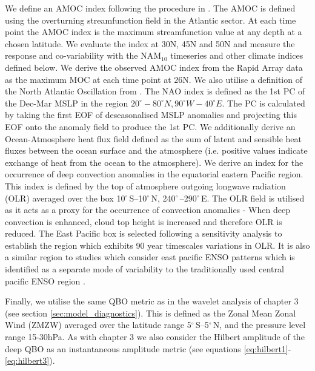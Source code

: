 We define an AMOC index following the procedure in \cite{reichlerStratospheric2012b}. The AMOC is defined using the overturning streamfunction field in the Atlantic sector. At each time point the AMOC index is the maximum streamfunction value at any depth at a chosen latitude. We evaluate the index at 30N, 45N and 50N and measure the response and co-variability with the NAM$_{10}$ timeseries and other climate indices defined below. We derive the observed AMOC index from the Rapid Array data as the maximum MOC at each time point at 26N. We also utilise a definition of the North Atlantic Oscillation from \cite{hurrellNorth2003c}. The NAO index is defined as the 1st PC of the Dec-Mar MSLP in the region $20^{\circ}-80^{\circ}N, 90^{\circ}W-40^{\circ}E$. The PC is calculated by taking the first EOF of deseasonalised MSLP anomalies and projecting this EOF onto the anomaly field to produce the 1st PC. We additionally derive an Ocean-Atmosphere heat flux field defined as the sum of latent and sensible heat fluxes between the ocean surface and the atmosphere (i.e. positive values indicate exchange of heat from the ocean to the atmosphere). We derive an index for the occurrence of deep convection anomalies in the equatorial eastern Pacific region. This index is defined by the top of atmosphere outgoing longwave radiation (OLR) averaged over the box 10$^{\circ}$\,S–10$^{\circ}$\,N, 240$^{\circ}$\,–290$^{\circ}$\,E. The OLR field is utilised as it acts as a proxy for the occurrence of convection anomalies - When deep convection is enhanced, cloud top height is increased and therefore OLR is reduced. The East Pacific box is selected following a sensitivity analysis to establish the region which exhibits 90 year timescales variations in OLR. It is also a similar region to studies which consider east pacific ENSO patterns which is identified as a separate mode of variability to the traditionally used central pacific ENSO region \citep{johnsonHow2013f}.

Finally, we utilise the same QBO metric as in the wavelet analysis of chapter 3 (see section \ref{sec:model_diagnostics}). This is defined as the Zonal Mean Zonal Wind (ZMZW) averaged over the latitude range 5$^{\circ}$\,S–5$^{\circ}$\,N,  and the pressure level range 15-30hPa. As with chapter 3 we also consider the Hilbert amplitude of the deep QBO as an instantaneous amplitude metric (see equations \ref{eq:hilbert1}-\ref{eq:hilbert3}). 

